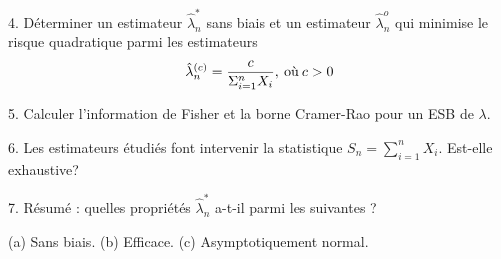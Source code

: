 \documentclass[11pt,a4paper]{article}
\begin{document}
\vspace{3mm}

4. D\'eterminer un estimateur $\hat \lambda_n^*$ sans biais et un
estimateur $\hat \lambda_n^o$ qui minimise le risque quadratique
parmi les estimateurs $$ \hat \lambda_n^{(c)} =
\frac{c}{\Sigma_{i=1}^n  X_i}, \: \hbox{où} \: c> 0$$


5. Calculer  l'information de Fisher et la borne Cramer-Rao pour un ESB de $\lambda$.

6. Les estimateurs \'etudi\'es font intervenir la statistique $S_n
= \sum_{i=1}^n X_i$. Est-elle exhaustive?


7. R\'esum\'e : quelles propri\'et\'es $\hat \lambda_n^*$ a-t-il
parmi les suivantes ?

(a) Sans biais. (b) Efficace. (c) Asymptotiquement normal.
\end{document}
